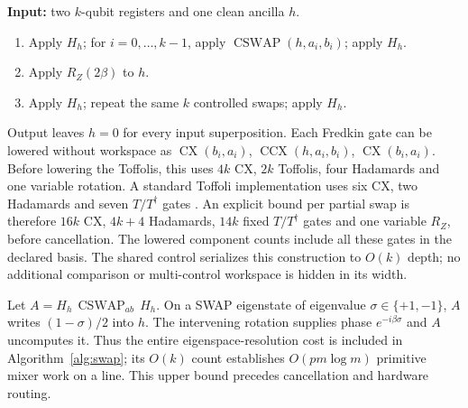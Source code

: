 \documentclass[manuscript,screen,review]{acmart}
\begin{document}
\begin{algorithm}[H]
\caption{Clean-ancilla partial register swap $\exp(-i\beta S_{ab})$}
\label{alg:swap}
\textbf{Input:} two $k$-qubit registers and one clean ancilla $h$.
\begin{enumerate}
\item Apply $H_h$; for $i=0,\ldots,k-1$, apply
$\operatorname{CSWAP}(h,a_i,b_i)$; apply $H_h$.
\item Apply $R_Z(2\beta)$ to $h$.
\item Apply $H_h$; repeat the same $k$ controlled swaps; apply $H_h$.
\end{enumerate}
Output leaves $h=0$ for every input superposition. Each Fredkin gate can be
lowered without workspace as
$\operatorname{CX}(b_i,a_i)$,
$\operatorname{CCX}(h,a_i,b_i)$,
$\operatorname{CX}(b_i,a_i)$.
Before lowering the Toffolis, this uses $4k$ CX, $2k$ Toffolis, four Hadamards
and one variable rotation. A standard Toffoli implementation uses six CX,
two Hadamards and seven $T/T^\dagger$ gates
\cite{shende2009toffoli}. An explicit bound per partial swap is therefore
$16k$ CX, $4k+4$ Hadamards, $14k$ fixed $T/T^\dagger$ gates and one variable
$R_Z$, before cancellation. The lowered component counts include all these
gates in the declared basis. The shared control serializes this
construction to $O(k)$ depth; no additional comparison or multi-control
workspace is hidden in its width.
\end{algorithm}

Let $A=H_h\,\operatorname{CSWAP}_{ab}\,H_h$. On a SWAP eigenstate of eigenvalue
$\sigma\in\{+1,-1\}$, $A$ writes $(1-\sigma)/2$ into $h$. The intervening
rotation supplies phase $e^{-i\beta\sigma}$ and $A$ uncomputes it. Thus the
entire eigenspace-resolution cost is included in Algorithm~\ref{alg:swap};
its $O(k)$ count establishes $O(pm\log m)$ primitive mixer work on a line.
This upper bound precedes cancellation and hardware routing.
\end{document}
